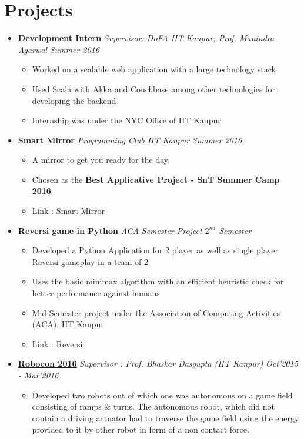 \documentclass[11pt,a4paper]{moderncv}
\newcommand{\experience}[3]{
  \item \textbf{\large{#1}} \hfill \emph{#3} \hfill \textit{#2}
}
\begin{document}
  \section{Projects}
    \begin{itemize}
      \experience{Development Intern}{Summer 2016}{Supervisor: DoFA IIT Kanpur, Prof. Manindra Agarwal}
      \begin{itemize}
        \item Worked on a scalable web application with a large technology stack
        \item Used Scala with Akka and Couchbase among other technologies for developing the backend
        \item Internship was under the NYC Office of IIT Kanpur
      \end{itemize}
      \experience{Smart Mirror}{Summer 2016}{Programming Club IIT Kanpur}
      \begin{itemize}
        \item A mirror to get you ready for the day.
        \item Chosen as the \textbf{Best Applicative Project - SnT Summer Camp 2016}
        \item Link : \href{https://pclub.in/project/2016/07/06/smartmirror.html}{Smart Mirror}
      \end{itemize}
      \experience{Reversi game in Python}{$2^{nd}$ Semester}{ACA Semester Project}
      \begin{itemize}
        \item Developed a Python Application for 2 player as well as single player Reversi gameplay in a team of 2
        \item Uses the basic minimax algorithm with an efficient heuristic check for better performance against humans
        \item Mid Semester project under the Association of Computing Activities (ACA), IIT Kanpur
        \item Link : \href{http://github.com/yashsriv/Reversi-Python}{Reversi}
      \end{itemize}
      \experience{\href{http://students.iitk.ac.in/robocon/}{Robocon 2016}}{Oct'2015 - Mar'2016}{Supervisor : Prof. Bhaskar Dasgupta (IIT Kanpur)}
      \begin{itemize}
        \item Developed two robots out of which one was autonomous on a game field consisting of ramps \& turns. The autonomous robot, which did not contain a driving actuator had to traverse the game field using the energy provided to it by other robot in form of a non contact force.

\end{itemize}
\end{itemize}
\end{document}
